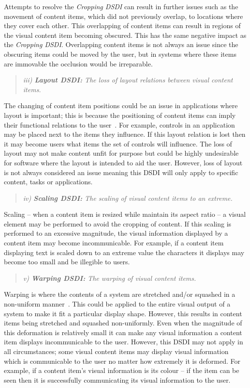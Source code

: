 \documentclass{bmcart}
\begin{document}
Attempts to resolve the {\emph{Cropping \ac{DSDI}}} can result in further issues such as the movement of content items, which did not previously overlap, to locations where they cover each other.
This overlapping of content items can result in regions of the visual content item becoming obscured.
This has the same negative impact as the {\emph{Cropping \ac{DSDI}}}.
Overlapping content items is not always an issue since the obscuring items could be moved by the user, but in systems where these items are immovable the occlusion would be irreparable.

\begin{quote}\emph{iii) \textbf{Layout \ac{DSDI}:} The loss of layout relations between visual content items.}\end{quote}

The changing of content item positions could be an issue in applications where layout is important; this is because the positioning of content items can imply their functional relations to the user~\cite{Constantine1999}.
For example, controls in an application may be placed next to the items they influence.
If this layout relation is lost then it may become users what items the set of controls will influence. 
The loss of layout may not make content unfit for purpose but could be highly undesirable for software where the layout is intended to aid the user.
However, loss of layout is not always considered an issue meaning this \ac{DSDI} will only apply to specific content, tasks or applications.

\begin{quote}\emph{iv) \textbf{Scaling \ac{DSDI}:} The scaling of visual content items to an extreme.}\end{quote}

Scaling -- when a content item is resized while maintain its aspect ratio -- a visual element may be performed to avoid the cropping of content.
If this scaling is performed to an excessive magnitude, the visual information displayed by a content item may become incommunicable.
For example, if a content item displaying text is scaled down to an extreme value the characters it displays may become too small and be illegible to users.

\begin{quote}\emph{v) \textbf{Warping \ac{DSDI}:} The warping of visual content items.}\end{quote}

Warping is where the contents of a system are stretched and/or squashed in a non-uniform manner~\cite{Milliron2002}.
This could be applied to the entire visual output of a system to make it fit a particular display shape.
However, this results in content items being stretched and squashed non-uniformly.
Even when the magnitude of this deformation is relatively small it can make any visual information a content item displays incommunicable to the user.
However, this \ac{DSDI} may not apply in all circumstances; some visual content items may display visual information which is communicable to the user no matter how extremely it is deformed.
For example, if a content item's visual information is its colour -- if the item can be seen then it is successfully communicating its visual information to the user.
\end{document}

